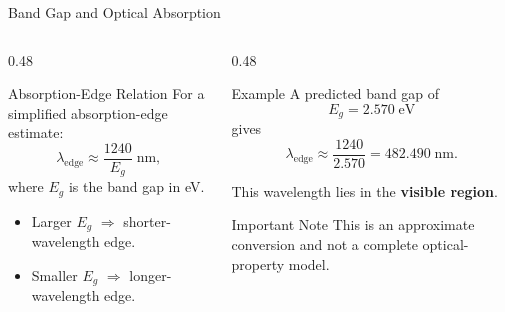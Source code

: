 \documentclass[aspectratio=169,11pt]{beamer}
\begin{document}
\begin{frame}{Band Gap and Optical Absorption}
	
	\begin{columns}[c]
		
		\begin{column}{0.48\textwidth}
			
			\begin{block}{Absorption-Edge Relation}
				For a simplified absorption-edge estimate:
				\[
				\lambda_{\mathrm{edge}}
				\approx
				\frac{1240}{E_g}\;\text{nm},
				\]
				where $E_g$ is the band gap in eV.
			\end{block}
			
			\vspace{0.25cm}
			
			\begin{itemize}
				\item Larger $E_g$
				$\Rightarrow$ shorter-wavelength edge.
				
				\item Smaller $E_g$
				$\Rightarrow$ longer-wavelength edge.
			\end{itemize}
			
		\end{column}
		
		\begin{column}{0.48\textwidth}
			
			\begin{block}{Example}
				A predicted band gap of
				\[
				E_g = 2.570\;\text{eV}
				\]
				gives
				\[
				\lambda_{\mathrm{edge}}
				\approx
				\frac{1240}{2.570}
				= 482.490\;\text{nm}.
				\]
				
				\vspace{0.15cm}
				
				This wavelength lies in the
				\textbf{visible region}.
			\end{block}
			
			\vspace{0.2cm}
			
			\begin{alertblock}{Important Note}
				This is an approximate conversion and
				not a complete optical-property model.
			\end{alertblock}
			
		\end{column}
		
	\end{columns}
	
\end{frame}
\end{document}
